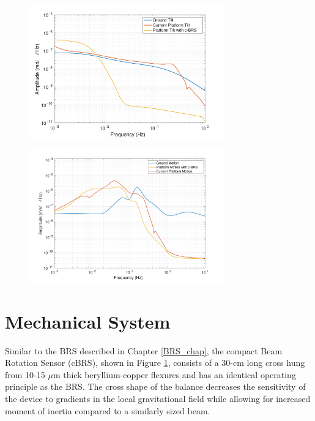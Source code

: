 \documentclass [12pt, proquest]{uwthesis}[2019]
\begin{document}
\begin{figure}%
\begin{center}
\includegraphics[width=0.75\textwidth]{cBRSRotation.pdf}
\caption{}
\label{cBRSR}
\end{center}
\end{figure}

\begin{figure}%
\begin{center}
\includegraphics[width=0.75\textwidth]{cBRSTranslation.pdf}
\caption{}
\label{cBRST}
\end{center}
\end{figure}

\section{Mechanical System}

Similar to the BRS described in Chapter \ref{BRS_chap}, the compact Beam Rotation Sensor (cBRS), shown in Figure \ref{}, consists of a 30-cm long cross hung from 10-15 $\mu$m thick beryllium-copper flexures and has an identical operating principle as the BRS. The cross shape of the balance decreases the sensitivity of the device to gradients in the local gravitational field while allowing for increased moment of inertia compared to a similarly sized beam. 
\end{document}
